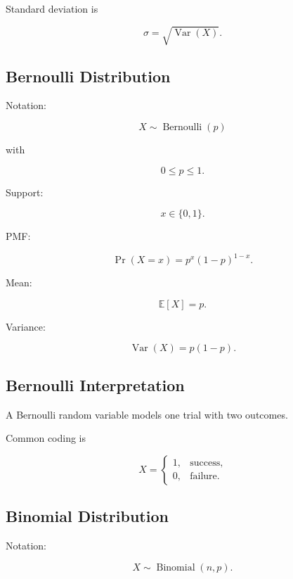 Standard deviation is

\[
\boxed{
\sigma
=
\sqrt{
\operatorname{Var}(X)
}.
}
\]

\subsection{Bernoulli Distribution}
\label{subsec:bernoulli-distribution-reference}

Notation:

\[
\boxed{
X\sim\operatorname{Bernoulli}(p)
}
\]

with

\[
0\leq p\leq1.
\]

Support:

\[
\boxed{
x\in\{0,1\}.
}
\]

PMF:

\[
\boxed{
\Pr(X=x)
=
p^x(1-p)^{1-x}.
}
\]

Mean:

\[
\boxed{
\mathbb{E}[X]=p.
}
\]

Variance:

\[
\boxed{
\operatorname{Var}(X)
=
p(1-p).
}
\]

\subsection{Bernoulli Interpretation}
\label{subsec:bernoulli-interpretation}

A Bernoulli random variable models one trial with two outcomes.

Common coding is

\[
\boxed{
X=
\begin{cases}
1, & \text{success},\\
0, & \text{failure}.
\end{cases}
}
\]

\subsection{Binomial Distribution}
\label{subsec:binomial-distribution-reference}

Notation:

\[
\boxed{
X\sim\operatorname{Binomial}(n,p).
}
\]

